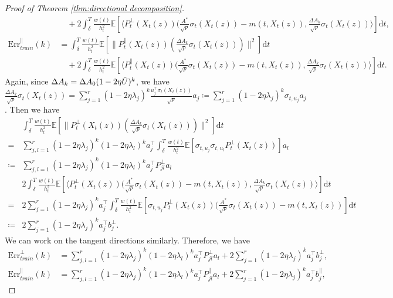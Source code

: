 \documentclass[11pt]{article}
\newcommand{\mb}{\mathbb}
\newcommand{\dee}{\mathrm{d}}
\newcommand{\Err}{\mathrm{Err}}
\begin{document}
\begin{proof}[Proof of Theorem \ref{thm:directional decomposition}]
\begin{align*}
    &\quad + 2\int_\delta^T \frac{w(t)}{h_t^2}\mb{E}[  \langle P_t^\perp(X_t(z))(\frac{A^*}{\sqrt{p}}\sigma_t(X_t(z)) -m(t,X_t(z) ) , \frac{\Delta A_k}{\sqrt{p}}\sigma_t(X_t(z)) \rangle ] \dee t, \\
    \Err_{train}^\parallel(k) & = \int_\delta^T \frac{w(t)}{h_t^2}\mb{E}[  \| P_t^\parallel(X_t(z)) (\frac{\Delta A_k }{\sqrt{p}}\sigma_t(X_t(z))) \|^2 ] \dee t \\
    &\quad + 2\int_\delta^T \frac{w(t)}{h_t^2}\mb{E}[  \langle P_t^\parallel(X_t(z))(\frac{A^*}{\sqrt{p}}\sigma_t(X_t(z)) -m(t,X_t(z) ) , \frac{\Delta A_k}{\sqrt{p}}\sigma_t(X_t(z)) \rangle ] \dee t.
\end{align*}
Again, since $\Delta A_k = \Delta A_0 (1-2\eta \Tilde{U})^k$, we have $\tfrac{\Delta A_k}{\sqrt{p}}\sigma_t(X_t(z)) = \sum_{j=1}^r (1-2\eta \lambda_j)^k \tfrac{u_j^\intercal \sigma_t(X_t(z))}{\sqrt{p}} a_j  \coloneqq \sum_{j=1}^r (1-2\eta \lambda_j)^k \sigma_{t,u_j} a_j $. Then we have
\begin{align*}
    & \int_\delta^T \frac{w(t)}{h_t^2}\mb{E}[  \| P_t^\perp(X_t(z)) (\frac{\Delta A_k }{\sqrt{p}}\sigma_t(X_t(z))) \|^2 ] \dee t \\
    = & \sum_{j,l=1}^r (1-2\eta \lambda_j)^k (1-2\eta \lambda_l)^k a_j^\intercal \int_\delta^T \frac{w(t)}{h_t^2} \mb{E}[ \sigma_{t,u_j}\sigma_{t,u_l} P_t^\perp(X_t(z))  ]a_l \\
    \coloneqq  & \sum_{j,l=1}^r (1-2\eta \lambda_j)^k (1-2\eta \lambda_l)^k a_j^\intercal P^\perp_{jl} a_l \\
    &2\int_\delta^T \frac{w(t)}{h_t^2}\mb{E}[  \langle P_t^\perp(X_t(z))(\frac{A^*}{\sqrt{p}}\sigma_t(X_t(z)) -m(t,X_t(z) ) , \frac{\Delta A_k}{\sqrt{p}}\sigma_t(X_t(z)) \rangle ] \dee t\\
 = & 2\sum_{j=1}^r (1-2\eta \lambda_j)^k a_j^\intercal \int_\delta^T \frac{w(t)}{h_t^2} \mb{E}[\sigma_{t,u_j} P_t^\perp(X_t(z)) ( \frac{A^*}{\sqrt{p}}\sigma_t(X_t(z)) -m(t,X_t(z) ) ] \dee t\\
 \coloneqq & 2\sum_{j=1}^r (1-2\eta \lambda_j)^k a_j^\intercal b_j^\perp.
\end{align*}
We can work on the tangent directions similarly. Therefore, we have
\begin{align*}
     \Err_{train}^\perp(k) & = \sum_{j,l=1}^r (1-2\eta \lambda_j)^k (1-2\eta \lambda_l)^k a_j^\intercal P^\perp_{jl} a_l + 2\sum_{j=1}^r (1-2\eta \lambda_j)^k a_j^\intercal b_j^\perp,\\
     \Err_{train}^\parallel(k) & = \sum_{j,l=1}^r (1-2\eta \lambda_j)^k (1-2\eta \lambda_l)^k a_j^\intercal P^\parallel_{jl} a_l + 2\sum_{j=1}^r (1-2\eta \lambda_j)^k a_j^\intercal b_j^\parallel,

\end{align*}
\end{proof}
\end{document}
